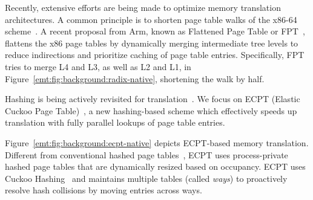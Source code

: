 Recently, extensive efforts are being made to optimize memory translation architectures.
A common principle is to shorten page table walks of the x86-64 scheme~\cite{park2022fpt,margaritov2019asap,
	ahn2012revisiting,karakostas2015redundant,alverti2020enhancing,gandhi2016agile,self:dmt}.
A recent proposal from Arm, known as Flattened Page Table or FPT~\cite{park2022fpt,Vougioukas2022fpt}, 
	flattens the x86 page tables by dynamically merging intermediate tree levels
	to reduce indirections and
	prioritize caching of page table entries.
Specifically, FPT tries to merge L4 and L3, as well as L2 and L1, in Figure~\ref{emt:fig:background:radix-native},
	shortening the walk by half.

Hashing is being actively revisited for translation~\cite{jovan2022nestedecpt,skarlatos2020ecpt,jovan2023memory,yaniv2016hash,vmware2021hashing,kanellopoulos2023utopia,gosakan2023mosaic, Kwon24}.
We focus on ECPT (Elastic Cuckoo Page Table)~\cite{skarlatos2020ecpt},
	a new hashing-based scheme
	which effectively speeds up translation with fully parallel lookups
	of page table entries.

	

Figure~\ref{emt:fig:background:ecpt-native} depicts ECPT-based memory translation.
Different from conventional hashed 
	page tables~\cite{yaniv2016hash,Dougan:1999,huck1993architectural,talluri1995pagetable,Gray05}, 
	ECPT uses process-private hashed page tables that are dynamically resized based on occupancy.
ECPT uses Cuckoo Hashing~\cite{pagh2004cuckoo} and maintains multiple tables (called {\it ways})
	to proactively resolve hash collisions 
	by moving entries across ways.

